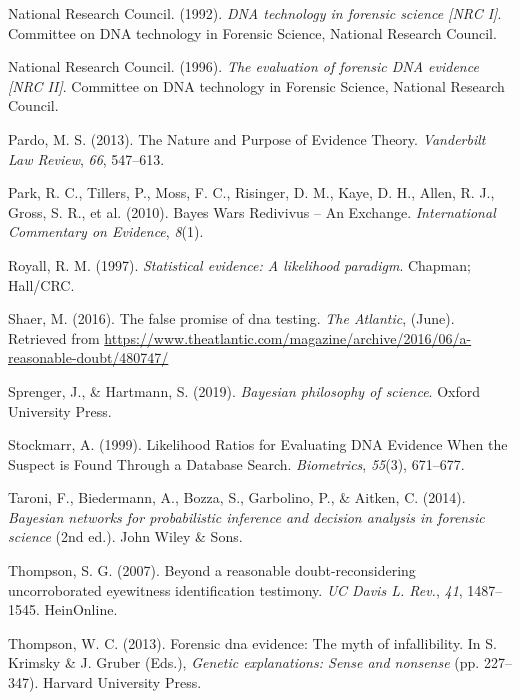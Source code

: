 \documentclass[10pt,dvipsnames,enabledeprecatedfontcommands]{scrartcl}
\begin{document}
\hypertarget{ref-NRCI1992}{}
National Research Council. (1992). \emph{DNA technology in forensic
science \textup{{[}NRC I{]}}}. Committee on DNA technology in Forensic
Science, National Research Council.

\hypertarget{ref-NRCII1996}{}
National Research Council. (1996). \emph{The evaluation of forensic DNA
evidence \textup{{[}NRC II{]}}}. Committee on DNA technology in Forensic
Science, National Research Council.

\hypertarget{ref-pardo2013NaturePurposeEvidence}{}
Pardo, M. S. (2013). The Nature and Purpose of Evidence Theory.
\emph{Vanderbilt Law Review}, \emph{66}, 547--613.

\hypertarget{ref-park2010BayesWarsRedivivus}{}
Park, R. C., Tillers, P., Moss, F. C., Risinger, D. M., Kaye, D. H.,
Allen, R. J., Gross, S. R., et al. (2010). Bayes Wars Redivivus -- An
Exchange. \emph{International Commentary on Evidence}, \emph{8}(1).

\hypertarget{ref-Royall1997}{}
Royall, R. M. (1997). \emph{Statistical evidence: A likelihood
paradigm}. Chapman; Hall/CRC.

\hypertarget{ref-Shaer2016False}{}
Shaer, M. (2016). The false promise of dna testing. \emph{The Atlantic},
(June). Retrieved from
\url{https://www.theatlantic.com/magazine/archive/2016/06/a-reasonable-doubt/480747/}

\hypertarget{ref-sprenger2019bayesian}{}
Sprenger, J., \& Hartmann, S. (2019). \emph{Bayesian philosophy of
science}. Oxford University Press.

\hypertarget{ref-stockmarr1999LikelihoodRatiosEvaluating}{}
Stockmarr, A. (1999). Likelihood Ratios for Evaluating DNA Evidence When
the Suspect is Found Through a Database Search. \emph{Biometrics},
\emph{55}(3), 671--677.

\hypertarget{ref-taroni2006bayesian}{}
Taroni, F., Biedermann, A., Bozza, S., Garbolino, P., \& Aitken, C.
(2014). \emph{Bayesian networks for probabilistic inference and decision
analysis in forensic science} (2nd ed.). John Wiley \& Sons.

\hypertarget{ref-thompson2007beyond}{}
Thompson, S. G. (2007). Beyond a reasonable doubt-reconsidering
uncorroborated eyewitness identification testimony. \emph{UC Davis L.
Rev.}, \emph{41}, 1487--1545. HeinOnline.

\hypertarget{ref-thompson2012forensic}{}
Thompson, W. C. (2013). Forensic dna evidence: The myth of
infallibility. In S. Krimsky \& J. Gruber (Eds.), \emph{Genetic
explanations: Sense and nonsense} (pp. 227--347). Harvard University
Press.
\end{document}
